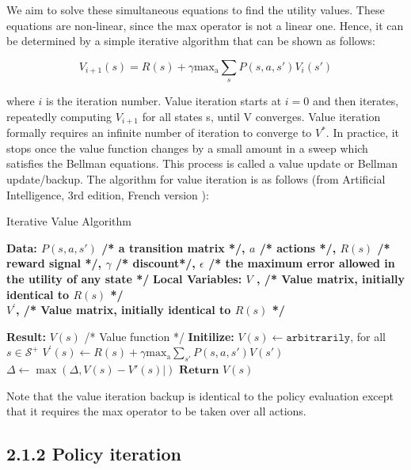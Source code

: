\documentclass[a4paper, 12pt]{report}
\begin{document}
We aim to solve these simultaneous equations to find the utility values.
These equations are non-linear, since the max operator is not a linear one.
Hence, it can be determined by a simple iterative algorithm that can be shown as follows:

\[V_{i+1}(s) = R(s) + \gamma \mathrm{max_a} \sum_s P(s,a,s') V_{i}(s')\]

where $i$ is the iteration number.
Value iteration starts at $i = 0$ and then iterates, repeatedly computing $V_{i+1}$ for all states s, until V converges.
Value iteration formally requires an infinite number of iteration to converge to $V^*$.
In practice, it stops once the value function changes by a small amount in a sweep which satisfies the Bellman equations.
This process is called a value update or Bellman update/backup. 
The algorithm for value iteration is as follows (from Artificial Intelligence, 3rd edition, French version \cite{Russell-2010}):

  
\begin{algorithm} \caption{Iterative Value Algorithm}
\begin{algorithmic}[H]
\State \textbf{Data:  $P(s,a,s')$ /* a transition matrix */, $a$ /* actions */, $R(s)$ /* reward signal */, $\gamma$ /* discount*/, $\epsilon$ /* the maximum error allowed in the utility of any state */}
\State \textbf{Local Variables: $V$ , /* Value matrix, initially identical to $R(s)$ */\\
$V^{'}$, /* Value matrix, initially identical to $R(s)$ */}

\State \textbf{Result:  } $V(s)$ /* Value function */
\State \textbf{Initilize: } 
\State $V(s) \gets \texttt{arbitrarily}$, for all $s \in \mathcal S^+$
\Repeat
\State $V^{'}(s) \gets R(s) + \gamma \mathrm{max_a} \sum_{s'} P(s,a,s') V(s')$
\State $\Delta \gets \max(\Delta, V(s) - V'(s)|)$
\EndFor
\Until {$\Delta < \epsilon$}
\State $\textbf{Return } V(s)$
\end{algorithmic}
\end{algorithm}

Note that the value iteration backup is identical to the policy evaluation except that it requires the max operator to be taken over all actions.

\subsection*{2.1.2 Policy iteration}
\end{document}
